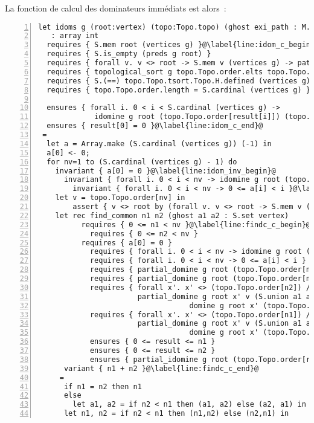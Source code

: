 \documentclass[a4paper,10pt]{article}
\begin{document}
La fonction de calcul des dominateurs immédiats est alors~:
\begin{lstlisting}[numbers=left,escapechar=@]
let idoms g (root:vertex) (topo:Topo.topo) (ghost exi_path : M.map vertex path)
   : array int
  requires { S.mem root (vertices g) }@\label{line:idom_c_begin}@
  requires { S.is_empty (preds g root) }
  requires { forall v. v <> root -> S.mem v (vertices g) -> path_to g (Cons root (M.get exi_path v)) v }
  requires { topological_sort g topo.Topo.order.elts topo.Topo.tsort.Topo.H.contents }
  requires { S.(==) topo.Topo.tsort.Topo.H.defined (vertices g) }
  requires { topo.Topo.order.length = S.cardinal (vertices g) }

  ensures { forall i. 0 < i < S.cardinal (vertices g) ->
             idomine g root (topo.Topo.order[result[i]]) (topo.Topo.order[i]) }
  ensures { result[0] = 0 }@\label{line:idom_c_end}@
 =
  let a = Array.make (S.cardinal (vertices g)) (-1) in
  a[0] <- 0;
  for nv=1 to (S.cardinal (vertices g) - 1) do
    invariant { a[0] = 0 }@\label{line:idom_inv_begin}@
	  invariant { forall i. 0 < i < nv -> idomine g root (topo.Topo.order[a[i]]) (topo.Topo.order[i]) }
		invariant { forall i. 0 < i < nv -> 0 <= a[i] < i }@\label{line:idom_inv_end}@
    let v = topo.Topo.order[nv] in
		assert { v <> root by (forall v. v <> root -> S.mem v (vertices g) -> path_to g (Cons root (M.get exi_path v)) v) };@\label{line:idom_v_not_root}@
    let rec find_common n1 n2 (ghost a1 a2 : S.set vertex)
		  requires { 0 <= n1 < nv }@\label{line:findc_c_begin}@
			requires { 0 <= n2 < nv }
		  requires { a[0] = 0 }
			requires { forall i. 0 < i < nv -> idomine g root (topo.Topo.order[a[i]]) (topo.Topo.order[i]) }
			requires { forall i. 0 < i < nv -> 0 <= a[i] < i }
			requires { partial_domine g root (topo.Topo.order[n1]) v a1 }@\label{line:findc_c_a}@
			requires { partial_domine g root (topo.Topo.order[n2]) v a2 }
			requires { forall x'. x' <> (topo.Topo.order[n2]) /\
			           partial_domine g root x' v (S.union a1 a2) ->
								   domine g root x' (topo.Topo.order[n2]) }
			requires { forall x'. x' <> (topo.Topo.order[n1]) /\
			           partial_domine g root x' v (S.union a1 a2) ->
								   domine g root x' (topo.Topo.order[n1]) }@\label{line:findc_c_b}@
			ensures { 0 <= result <= n1 }
			ensures { 0 <= result <= n2 }
			ensures { partial_idomine g root (topo.Topo.order[result]) v (S.union a1 a2) }
      variant { n1 + n2 }@\label{line:findc_c_end}@
     =
      if n1 = n2 then n1
      else
  		let a1, a2 = if n2 < n1 then (a1, a2) else (a2, a1) in
      let n1, n2 = if n2 < n1 then (n1,n2) else (n2,n1) in

\end{lstlisting}
\end{document}
